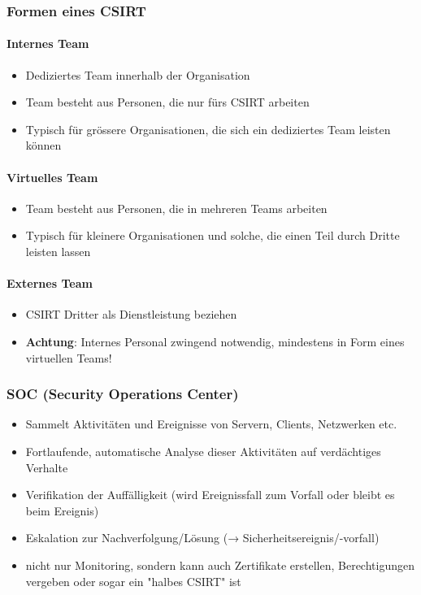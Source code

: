 \subsubsection{Formen eines CSIRT}
\paragraph{Internes Team}
\begin{itemize}
    \item Dediziertes Team innerhalb der Organisation
    \item Team besteht aus Personen, die nur fürs CSIRT arbeiten
    \item Typisch für grössere Organisationen, die sich ein dediziertes Team leisten können
\end{itemize}

\paragraph{Virtuelles Team}
\begin{itemize}
    \item Team besteht aus Personen, die in mehreren Teams arbeiten
    \item Typisch für kleinere Organisationen und solche, die einen Teil durch Dritte leisten lassen
\end{itemize}

\paragraph{Externes Team}
\begin{itemize}
    \item CSIRT Dritter als Dienstleistung beziehen
    \item \textbf{Achtung}: Internes Personal zwingend notwendig, mindestens in Form eines virtuellen Teams!
\end{itemize}

\subsubsection{SOC (Security Operations Center)}
\begin{itemize}
    \item Sammelt Aktivitäten und Ereignisse von Servern, Clients, Netzwerken etc.
    \item Fortlaufende, automatische Analyse dieser Aktivitäten auf verdächtiges Verhalte
    \item Verifikation der Auffälligkeit (wird Ereignissfall zum Vorfall oder bleibt es beim Ereignis)
    \item Eskalation zur Nachverfolgung/Lösung (→ Sicherheitsereignis/-vorfall)
    \item nicht nur Monitoring, sondern kann auch Zertifikate erstellen, Berechtigungen vergeben oder sogar ein "halbes CSIRT" ist
\end{itemize}

